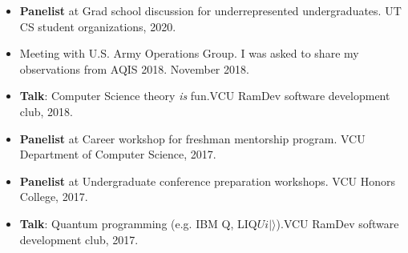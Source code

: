 \documentclass[11pt,letterpaper,serif]{moderncv}
\begin{document}
\begin{itemize}
	\item[\textbullet] \textbf{Panelist} at Grad school discussion for underrepresented undergraduates. UT CS student organizations, 2020.
	\item[\textbullet] Meeting with U.S. Army Operations Group. I was asked to share my observations from AQIS 2018. November 2018.
	\item[\textbullet] \textbf{Talk}: Computer Science theory \emph{is} fun.\quad VCU RamDev software development club, 2018.
	\item[\textbullet] \textbf{Panelist} at Career workshop for freshman mentorship program. VCU Department of Computer Science, 2017.
	\item[\textbullet] \textbf{Panelist} at Undergraduate conference preparation workshops. VCU Honors College, 2017.
	\item[\textbullet] \textbf{Talk}: Quantum programming (e.g. IBM Q, LIQ$Ui|\rangle$).\quad VCU RamDev software development club, 2017.
\end{itemize}
\end{document}
